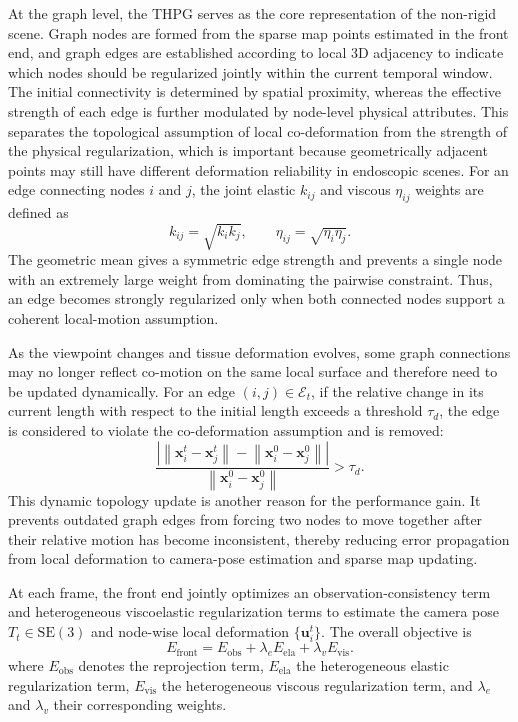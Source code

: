 \documentclass[pdflatex,sn-mathphys-num]{sn-jnl}
\begin{document}
At the graph level, the THPG serves as the core representation of the non-rigid scene. Graph nodes are formed from the sparse map points estimated in the front end, and graph edges are established according to local 3D adjacency to indicate which nodes should be regularized jointly within the current temporal window. The initial connectivity is determined by spatial proximity, whereas the effective strength of each edge is further modulated by node-level physical attributes. This separates the topological assumption of local co-deformation from the strength of the physical regularization, which is important because geometrically adjacent points may still have different deformation reliability in endoscopic scenes. For an edge connecting nodes $i$ and $j$, the joint elastic $k_{ij}$ and viscous $\eta_{ij}$ weights are defined as
\begin{equation}
k_{ij} = \sqrt{k_i k_j}, \qquad \eta_{ij} = \sqrt{\eta_i \eta_j}.
\label{eq:edgeweights}
\end{equation}
The geometric mean gives a symmetric edge strength and prevents a single node with an extremely large weight from dominating the pairwise constraint. Thus, an edge becomes strongly regularized only when both connected nodes support a coherent local-motion assumption.

As the viewpoint changes and tissue deformation evolves, some graph connections may no longer reflect co-motion on the same local surface and therefore need to be updated dynamically. For an edge $(i,j) \in \mathcal{E}_t$, if the relative change in its current length with respect to the initial length exceeds a threshold $\tau_d$, the edge is considered to violate the co-deformation assumption and is removed:
\begin{equation}
\frac{\left|\left\lVert \mathbf{x}_i^t - \mathbf{x}_j^t \right\rVert - \left\lVert \mathbf{x}_i^0 - \mathbf{x}_j^0 \right\rVert\right|}{\left\lVert \mathbf{x}_i^0 - \mathbf{x}_j^0 \right\rVert} > \tau_d.
\label{eq:topology}
\end{equation}
This dynamic topology update is another reason for the performance gain. It prevents outdated graph edges from forcing two nodes to move together after their relative motion has become inconsistent, thereby reducing error propagation from local deformation to camera-pose estimation and sparse map updating.

At each frame, the front end jointly optimizes an observation-consistency term and heterogeneous viscoelastic regularization terms to estimate the camera pose $T_t \in \mathrm{SE}(3)$ and node-wise local deformation $\{\mathbf{u}_i^t\}$. The overall objective is
\begin{equation}
E_{\mathrm{front}} = E_{\mathrm{obs}} + \lambda_e E_{\mathrm{ela}} + \lambda_v E_{\mathrm{vis}}.
\label{eq:front}
\end{equation}
where $E_{\mathrm{obs}}$ denotes the reprojection term, $E_{\mathrm{ela}}$ the heterogeneous elastic regularization term, $E_{\mathrm{vis}}$ the heterogeneous viscous regularization term, and $\lambda_e$ and $\lambda_v$ their corresponding weights.
\end{document}

